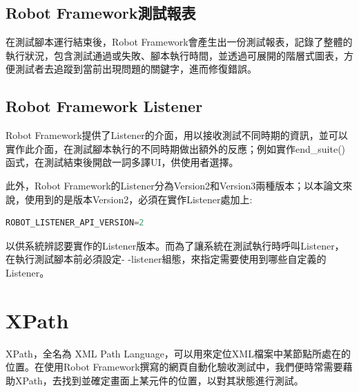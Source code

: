 \subsection{Robot Framework測試報表}
在測試腳本運行結束後，Robot Framework會產生出一份測試報表，記錄了整體的執行狀況，包含測試通過或失敗、腳本執行時間，並透過可展開的階層式圖表，方便測試者去追蹤到當前出現問題的關鍵字，進而修復錯誤。

\subsection{Robot Framework Listener}
Robot Framework提供了Listener\cite{rfguide}的介面，用以接收測試不同時期的資訊，並可以實作此介面，在測試腳本執行的不同時期做出額外的反應；例如實作end\_suite()函式，在測試結束後開啟一詞多譯UI，供使用者選擇。

此外，Robot Framework的Listener分為Version2和Version3兩種版本；以本論文來說，使用到的是版本Version2，必須在實作Listener處加上:
\begin{lstlisting}[language={python}]
ROBOT_LISTENER_API_VERSION=2
\end{lstlisting}
以供系統辨認要實作的Listener版本。而為了讓系統在測試執行時呼叫Listener，在執行測試腳本前必須設定- -listener組態，來指定需要使用到哪些自定義的Listener。

\section{XPath}
XPath\cite{xpath}，全名為 XML Path Language，可以用來定位XML檔案中某節點所處在的位置。在使用Robot Framework撰寫的網頁自動化驗收測試中，我們便時常需要藉助XPath，去找到並確定畫面上某元件的位置，以對其狀態進行測試。


